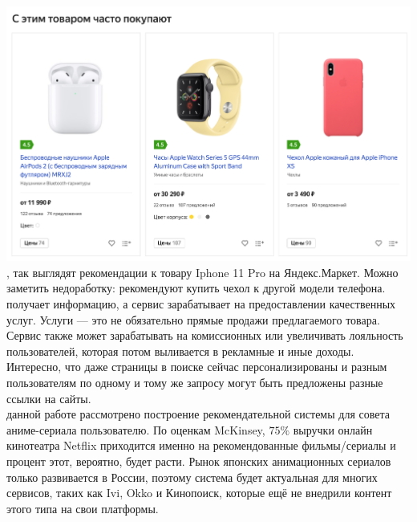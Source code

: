 \documentclass{article}
\newcommand\tab[1][1cm]{\hspace*{#1}}
\begin{document}
\tab\includegraphics[scale=0.30]{f1.png}\\
, так выглядят рекомендации к товару Iphone 11 Pro на Яндекс.Маркет. Можно заметить недоработку: рекомендуют купить чехол к другой модели телефона.\\
 получает информацию, а сервис зарабатывает на предоставлении качественных услуг. Услуги — это не обязательно прямые продажи предлагаемого товара. Сервис также может зарабатывать на комиссионных или увеличивать лояльность пользователей, которая потом выливается в рекламные и иные доходы. Интересно, что даже страницы в поиске сейчас персонализированы и разным пользователям по одному и тому же запросу могут быть предложены разные ссылки на сайты.\\
 данной работе рассмотрено построение рекомендательной системы для совета аниме-сериала пользователю. По оценкам McKinsey, $75\%$ выручки онлайн кинотеатра Netflix приходится именно на рекомендованные фильмы/сериалы и процент этот, вероятно, будет расти. Рынок японских анимационных сериалов только развивается в России, поэтому система будет актуальная для многих сервисов, таких как Ivi, Okko и Кинопоиск, которые ещё не внедрили контент этого типа на свои платформы.\\
\qquad 

\newpage
\end{document}

